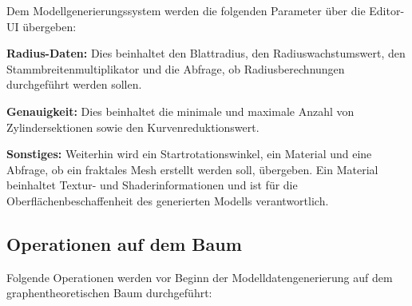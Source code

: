 Dem Modellgenerierungssystem werden die folgenden Parameter über die Editor-UI übergeben:

\begin{description}
	\item \textbf{Radius-Daten:} Dies beinhaltet den Blattradius, den Radiuswachstumswert, den Stammbreitenmultiplikator und die Abfrage, ob Radiusberechnungen durchgeführt werden sollen. \\
	
	\item \textbf{Genauigkeit:} Dies beinhaltet die minimale und maximale Anzahl von Zylindersektionen sowie den Kurvenreduktionswert. \\
	
	\item \textbf{Sonstiges:} Weiterhin wird ein Startrotationswinkel, ein Material und eine Abfrage, ob ein fraktales Mesh erstellt werden soll, übergeben. Ein Material beinhaltet Textur- und Shaderinformationen und ist für die Oberflächenbeschaffenheit des generierten Modells verantwortlich.
\end{description}

\subsection{Operationen auf dem Baum}

Folgende Operationen werden vor Beginn der Modelldatengenerierung auf dem graphentheoretischen Baum durchgeführt:

